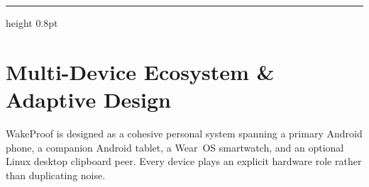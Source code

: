 \documentclass[11pt,a4paper]{article}
\begin{document}
\newpage
\tableofcontents
\vspace{8pt}
{\color{wpborder}\hrule height 0.8pt}

\section{Multi-Device Ecosystem \& Adaptive Design}

WakeProof is designed as a cohesive personal system spanning a primary Android phone, a companion Android tablet, a Wear~OS smartwatch, and an optional Linux desktop clipboard peer. Every device plays an explicit hardware role rather than duplicating noise.
\end{document}
